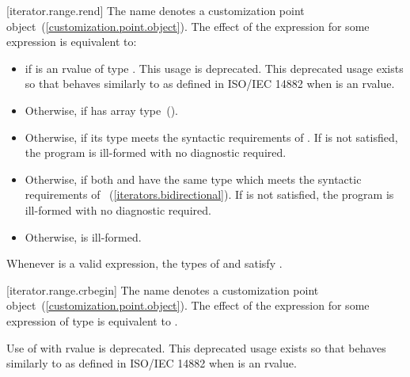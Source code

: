 {[iterator.range.rend]{}
\pnum
The name  denotes a customization point
object~(\ref{customization.point.object}). The effect of the expression
 for some expression  is equivalent to:

\begin{itemize}
\item
   if  is an rvalue of
  type . This usage is deprecated.
  \enternote This deprecated usage exists so that
   behaves similarly to 
  as defined in ISO/IEC 14882 when  is an rvalue. \exitnote

\item
  Otherwise,  if  has
  array type~().

\item
  Otherwise,  if its type  meets the
  syntactic requirements of
  . If
   is not satisfied, the program is ill-formed with
  no diagnostic required.

\item
  Otherwise,  if both
   and  have the same
  type  which meets the syntactic requirements of
  ~(\ref{iterators.bidirectional}).
  If  is not satisfied, the program is
  ill-formed with no diagnostic required.

\item
  Otherwise,  is ill-formed.
\end{itemize}

\pnum
\remark Whenever  is a valid expression, the
types of  and  satisfy
.

[iterator.range.crbegin]{}
\pnum
The name  denotes a customization point
object~(\ref{customization.point.object}). The effect of the expression
 for some expression  of type 
is equivalent to .

\pnum
Use of  with rvalue  is deprecated.
\enternote This deprecated usage exists so that 
behaves similarly to  as defined in ISO/IEC 14882 when
 is an rvalue. \exitnote

}
